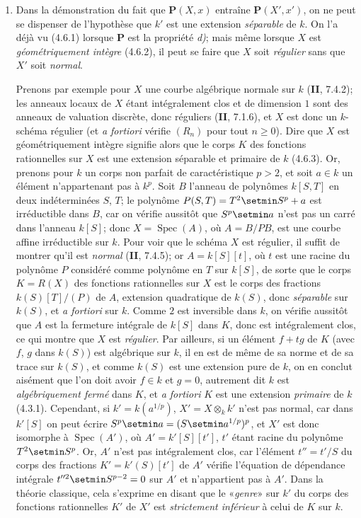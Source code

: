 \begin{remarks}[6.7.5]
\label{IV.2.s6.7.5-fr}
\begin{enumerate}
\item[(i)] Dans la démonstration du fait que $\boldsymbol{P}(X,x)$ entraîne
$\boldsymbol{P}(X',x')$, on ne peut se dispenser de l'hypothèse que $k'$ est une
extension \emph{séparable} de $k$. On l'a déjà vu (4.6.1) lorsque $\boldsymbol{P}$ est la
propriété \emph{d)}; mais même lorsque $X$ est \emph{géométriquement intègre} (4.6.2),
il peut se faire que $X$ soit \emph{régulier} sans que $X'$ soit \emph{normal}.

Prenons par exemple pour $X$ une courbe algébrique normale sur $k$
(\textbf{II}, 7.4.2); les anneaux locaux de $X$ étant intégralement clos et de
dimension $1$ sont des anneaux de valuation discrète, donc réguliers
(\textbf{II}, 7.1.6), et $X$ est donc un $k$-schéma régulier (et \emph{a fortiori}
vérifie $(R_n)$ pour tout $n\geqslant0$). Dire que $X$ est géométriquement
intègre signifie alors que le corps $K$ des fonctions rationnelles sur
$X$ est une extension séparable et primaire de $k$ (4.6.3).
Or, prenons pour $k$ un corps non parfait de caractéristique $p>2$, et
soit $a\in k$ un élément n'appartenant pas à $k^p$. Soit
$B$ l'anneau de polynômes $k[S,T]$ en deux indéterminées $S$, $T$; le
polynôme $P(S,T)=T^2\setmin S^p+a$
est irréductible dans $B$, car on vérifie aussitôt que $S^p\setmin a$ n'est pas
un carré dans l'anneau $k[S]$; donc $X=\operatorname{Spec}(A)$, où $A=B/PB$,
est une courbe affine irréductible sur $k$. Pour voir que le schéma $X$
est régulier, il suffit de montrer qu'il est \emph{normal} (\textbf{II}, 7.4.5); or
$A=k[S][t]$, où $t$ est une racine du polynôme $P$ considéré comme
polynôme en $T$ sur $k[S]$, de sorte que le corps $K=R(X)$ des fonctions
rationnelles sur $X$ est le corps des fractions $k(S)[T]/(P)$ de $A$,
extension quadratique de $k(S)$, donc \emph{séparable} sur $k(S)$, et \emph{a fortiori}
sur $k$. Comme $2$ est inversible dans $k$, on vérifie aussitôt que $A$
est la fermeture intégrale de $k[S]$ dans $K$, donc est intégralement clos,
ce qui montre que $X$ est \emph{régulier}. Par ailleurs, si un élément $f+tg$
de $K$ (avec $f$, $g$ dans $k(S)$) est algébrique sur $k$, il en est de même de
sa norme et de sa trace sur $k(S)$, et comme $k(S)$ est une extension pure
de $k$, on en conclut aisément que l'on doit avoir $f\in k$ et $g=0$,
autrement dit $k$ est \emph{algébriquement fermé} dans $K$, et \emph{a fortiori} $K$
est une extension \emph{primaire}
de $k$ (4.3.1). Cependant, si
$k'=k(a^{1/p})$, $X'=X\otimes_k k'$ n'est pas normal, car dans $k'[S]$
on peut écrire $S^p\setmin a=(S\setmin a^{1/p})^p$, et $X'$ est donc isomorphe à
$\operatorname{Spec}(A')$, où $A'=k'[S][t']$, $t'$ étant racine du
polynôme $T^2\setmin S^p$. Or, $A'$ n'est pas intégralement clos, car l'élément
$t''=t'/S$ du corps des fractions $K'=k'(S)[t']$ de $A'$ vérifie
l'équation de dépendance intégrale $t''^2\setmin S^{p-2}=0$ sur $A'$ et
n'appartient pas à $A'$. Dans la théorie classique, cela s'exprime en
disant que le «\emph{genre}» sur $k'$ du corps des fonctions rationnelles $K'$ de
$X'$ est \emph{strictement inférieur} à celui de $K$ sur $k$.


\end{enumerate}
\end{remarks}
